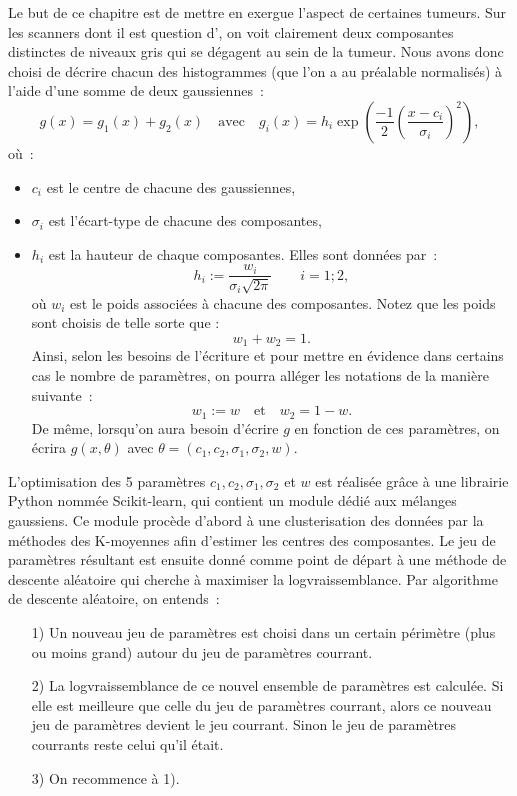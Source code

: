 \documentclass[main.tex]{subfiles}
\begin{document}
Le but de ce chapitre est de mettre en exergue l'aspect \heterogene de certaines tumeurs. Sur les scanners dont il est question d'\hetero, on voit clairement deux composantes distinctes de niveaux gris qui se dégagent au sein de la tumeur. Nous avons donc choisi de décrire chacun des histogrammes (que l'on a au préalable normalisés) à l'aide d'une somme de deux gaussiennes~:
\begin{equation}
\label{eq:decomp_gaussienne}
g(x) = g_1(x)+g_2(x) \quad \textrm{avec} \quad g_i(x) = h_i\exp \left(\frac{-1}{2} \left( \dfrac{x-c_i}{\sigma_i}\right)^2  \right),
\end{equation}
où~:
\begin{itemize}
\item $c_i$ est le centre de chacune des gaussiennes,
\item $\sigma_i$ est l'écart-type de chacune des composantes,
\item $h_i$ est la hauteur de chaque composantes. Elles sont données par~:
\begin{equation}
\label{eq:hauteur_gaussienne}
h_i := \dfrac{w_i}{\sigma_i \sqrt{2\pi}} \qquad i=1;2,
\end{equation}
où $w_i$ est le poids associées à chacune des composantes. Notez que les poids sont choisis de telle sorte que :
\begin{equation}
w_1+w_2=1.
\end{equation}
Ainsi, selon les besoins de l'écriture et pour mettre en évidence dans certains cas le nombre de paramètres, on pourra alléger les notations de la manière suivante~:
\begin{equation}
\label{eq:renomage_w}
w_1 := w \quad \textrm{et} \quad w_2 = 1 - w.
\end{equation}
De même, lorsqu'on aura besoin d'écrire $g$ en fonction de ces paramètres, on écrira $g(x,\theta)$ avec $\theta =( c_1,c_2,\sigma_1,\sigma_2,w  )$.
\end{itemize}
L'optimisation des 5 paramètres $c_1,c_2,\sigma_1,\sigma_2$ et $w$ est réalisée grâce à une librairie Python nommée Scikit-learn, qui contient un module dédié aux mélanges gaussiens. Ce module procède d'abord à une clusterisation des données par la méthodes des K-moyennes afin d'estimer les centres des composantes. Le jeu de paramètres résultant est ensuite donné comme point de départ à une méthode de descente aléatoire qui cherche à maximiser la logvraissemblance. Par algorithme de descente aléatoire, on entends~:
\begin{itemize}
\item[1)] Un nouveau jeu de paramètres est choisi dans un certain périmètre (plus ou moins grand) autour du jeu de paramètres courrant.
\item[2)] La logvraissemblance de ce nouvel ensemble de paramètres est calculée. Si elle est meilleure que celle du jeu de paramètres courrant, alors ce nouveau jeu de paramètres devient le jeu courrant. Sinon le jeu de paramètres courrants reste celui qu'il était.
\item[3)] On recommence à 1).
\end{itemize}
\end{document}
